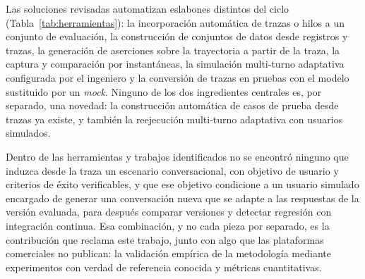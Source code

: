 Las soluciones revisadas automatizan eslabones distintos del ciclo (Tabla~\ref{tab:herramientas}): la incorporación automática de trazas o hilos a un conjunto de evaluación, la construcción de conjuntos de datos desde registros y trazas, la generación de aserciones sobre la trayectoria a partir de la traza, la captura y comparación por instantáneas, la simulación multi-turno adaptativa configurada por el ingeniero y la conversión de trazas en pruebas con el modelo sustituido por un \textit{mock}. Ninguno de los dos ingredientes centrales es, por separado, una novedad: la construcción automática de casos de prueba desde trazas ya existe, y también la reejecución multi-turno adaptativa con usuarios simulados.
\par\vspace{6pt}
Dentro de las herramientas y trabajos identificados no se encontró ninguno que induzca desde la traza un escenario conversacional, con objetivo de usuario y criterios de éxito verificables, y que ese objetivo condicione a un usuario simulado encargado de generar una conversación nueva que se adapte a las respuestas de la versión evaluada, para después comparar versiones y detectar regresión con integración continua. Esa combinación, y no cada pieza por separado, es la contribución que reclama este trabajo, junto con algo que las plataformas comerciales no publican: la validación empírica de la metodología mediante experimentos con verdad de referencia conocida y métricas cuantitativas.
\par\vspace{6pt}

